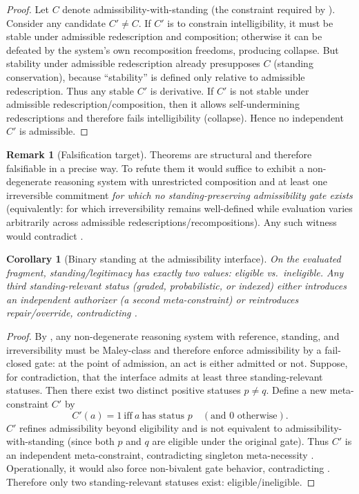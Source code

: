 \documentclass[11pt]{article}
\newtheorem{corollary}[theorem]{Corollary}
\theoremstyle{definition}
\newtheorem{remark}[theorem]{Remark}
\begin{document}
\begin{proof}
Let $C$ denote admissibility-with-standing (the constraint required by ).
Consider any candidate $C'\neq C$.
If $C'$ is to constrain intelligibility, it must be stable under admissible redescription and composition; otherwise it can be defeated by the system's own recomposition freedoms, producing collapse.
But stability under admissible redescription already presupposes $C$ (standing conservation), because ``stability'' is defined only relative to admissible redescription.
Thus any stable $C'$ is derivative.
If $C'$ is not stable under admissible redescription/composition, then it allows self-undermining redescriptions and therefore fails intelligibility (collapse).
Hence no independent $C'$ is admissible.
\end{proof}

\begin{remark}[Falsification target]
\label{rem:falsification}
Theorems  are structural and therefore falsifiable in a precise way.
To refute them it would suffice to exhibit a non-degenerate reasoning system with unrestricted composition and at least one irreversible commitment \emph{for which no standing-preserving admissibility gate exists} (equivalently: for which irreversibility remains well-defined while evaluation varies arbitrarily across admissible redescriptions/recompositions).
Any such witness would contradict .
\end{remark}



\begin{corollary}[Binary standing at the admissibility interface]
\label{cor:binary}
On the evaluated fragment, standing/legitimacy has exactly two values: eligible vs.\ ineligible.
Any third standing-relevant status (graded, probabilistic, or indexed) either introduces an independent authorizer (a second meta-constraint) or reintroduces repair/override, contradicting .
\end{corollary}

\begin{proof}
By , any non-degenerate reasoning system with reference, standing, and irreversibility must be Maley-class and therefore enforce admissibility by a fail-closed gate: at the point of admission, an act is either admitted or not.
Suppose, for contradiction, that the interface admits at least three standing-relevant statuses.
Then there exist two distinct positive statuses $p\neq q$.
Define a new meta-constraint $C'$ by
\[
C'(a)=1 \ \text{iff}\ a\ \text{has status }p\quad (\text{and }0\text{ otherwise}).
\]
$C'$ refines admissibility beyond eligibility and is not equivalent to admissibility-with-standing (since both $p$ and $q$ are eligible under the original gate).
Thus $C'$ is an independent meta-constraint, contradicting singleton meta-necessity .
Operationally, it would also force non-bivalent gate behavior, contradicting .
Therefore only two standing-relevant statuses exist: eligible/ineligible.
\end{proof}
\end{document}
